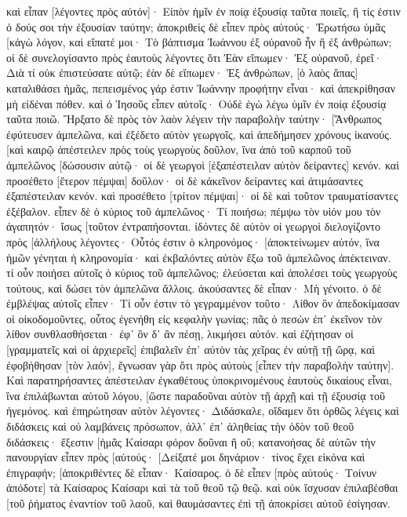 καὶ εἶπαν [λέγοντες πρὸς αὐτόν]· Εἰπὸν ἡμῖν ἐν ποίᾳ ἐξουσίᾳ ταῦτα ποιεῖς, ἢ τίς ἐστιν ὁ δούς σοι τὴν ἐξουσίαν ταύτην; 
ἀποκριθεὶς δὲ εἶπεν πρὸς αὐτούς· Ἐρωτήσω ὑμᾶς [κἀγὼ λόγον, καὶ εἴπατέ μοι· 
Τὸ βάπτισμα Ἰωάννου ἐξ οὐρανοῦ ἦν ἢ ἐξ ἀνθρώπων; 
οἱ δὲ συνελογίσαντο πρὸς ἑαυτοὺς λέγοντες ὅτι Ἐὰν εἴπωμεν· Ἐξ οὐρανοῦ, ἐρεῖ· Διὰ τί οὐκ ἐπιστεύσατε αὐτῷ; 
ἐὰν δὲ εἴπωμεν· Ἐξ ἀνθρώπων, [ὁ λαὸς ἅπας] καταλιθάσει ἡμᾶς, πεπεισμένος γάρ ἐστιν Ἰωάννην προφήτην εἶναι· 
καὶ ἀπεκρίθησαν μὴ εἰδέναι πόθεν. 
καὶ ὁ Ἰησοῦς εἶπεν αὐτοῖς· Οὐδὲ ἐγὼ λέγω ὑμῖν ἐν ποίᾳ ἐξουσίᾳ ταῦτα ποιῶ. 
Ἤρξατο δὲ πρὸς τὸν λαὸν λέγειν τὴν παραβολὴν ταύτην· [Ἄνθρωπος ἐφύτευσεν ἀμπελῶνα, καὶ ἐξέδετο αὐτὸν γεωργοῖς, καὶ ἀπεδήμησεν χρόνους ἱκανούς. 
[καὶ καιρῷ ἀπέστειλεν πρὸς τοὺς γεωργοὺς δοῦλον, ἵνα ἀπὸ τοῦ καρποῦ τοῦ ἀμπελῶνος [δώσουσιν αὐτῷ· οἱ δὲ γεωργοὶ [ἐξαπέστειλαν αὐτὸν δείραντες] κενόν. 
καὶ προσέθετο [ἕτερον πέμψαι] δοῦλον· οἱ δὲ κἀκεῖνον δείραντες καὶ ἀτιμάσαντες ἐξαπέστειλαν κενόν. 
καὶ προσέθετο [τρίτον πέμψαι]· οἱ δὲ καὶ τοῦτον τραυματίσαντες ἐξέβαλον. 
εἶπεν δὲ ὁ κύριος τοῦ ἀμπελῶνος· Τί ποιήσω; πέμψω τὸν υἱόν μου τὸν ἀγαπητόν· ἴσως [τοῦτον ἐντραπήσονται. 
ἰδόντες δὲ αὐτὸν οἱ γεωργοὶ διελογίζοντο πρὸς [ἀλλήλους λέγοντες· Οὗτός ἐστιν ὁ κληρονόμος· [ἀποκτείνωμεν αὐτόν, ἵνα ἡμῶν γένηται ἡ κληρονομία· 
καὶ ἐκβαλόντες αὐτὸν ἔξω τοῦ ἀμπελῶνος ἀπέκτειναν. τί οὖν ποιήσει αὐτοῖς ὁ κύριος τοῦ ἀμπελῶνος; 
ἐλεύσεται καὶ ἀπολέσει τοὺς γεωργοὺς τούτους, καὶ δώσει τὸν ἀμπελῶνα ἄλλοις. ἀκούσαντες δὲ εἶπαν· Μὴ γένοιτο. 
ὁ δὲ ἐμβλέψας αὐτοῖς εἶπεν· Τί οὖν ἐστιν τὸ γεγραμμένον τοῦτο· Λίθον ὃν ἀπεδοκίμασαν οἱ οἰκοδομοῦντες, οὗτος ἐγενήθη εἰς κεφαλὴν γωνίας; 
πᾶς ὁ πεσὼν ἐπ᾽ ἐκεῖνον τὸν λίθον συνθλασθήσεται· ἐφ᾽ ὃν δ᾽ ἂν πέσῃ, λικμήσει αὐτόν. 
καὶ ἐζήτησαν οἱ [γραμματεῖς καὶ οἱ ἀρχιερεῖς] ἐπιβαλεῖν ἐπ᾽ αὐτὸν τὰς χεῖρας ἐν αὐτῇ τῇ ὥρᾳ, καὶ ἐφοβήθησαν [τὸν λαόν], ἔγνωσαν γὰρ ὅτι πρὸς αὐτοὺς [εἶπεν τὴν παραβολὴν ταύτην]. 
Καὶ παρατηρήσαντες ἀπέστειλαν ἐγκαθέτους ὑποκρινομένους ἑαυτοὺς δικαίους εἶναι, ἵνα ἐπιλάβωνται αὐτοῦ λόγου, [ὥστε παραδοῦναι αὐτὸν τῇ ἀρχῇ καὶ τῇ ἐξουσίᾳ τοῦ ἡγεμόνος. 
καὶ ἐπηρώτησαν αὐτὸν λέγοντες· Διδάσκαλε, οἴδαμεν ὅτι ὀρθῶς λέγεις καὶ διδάσκεις καὶ οὐ λαμβάνεις πρόσωπον, ἀλλ᾽ ἐπ᾽ ἀληθείας τὴν ὁδὸν τοῦ θεοῦ διδάσκεις· 
ἔξεστιν [ἡμᾶς Καίσαρι φόρον δοῦναι ἢ οὔ; 
κατανοήσας δὲ αὐτῶν τὴν πανουργίαν εἶπεν πρὸς [αὐτούς· 
[Δείξατέ μοι δηνάριον· τίνος ἔχει εἰκόνα καὶ ἐπιγραφήν; [ἀποκριθέντες δὲ εἶπαν· Καίσαρος. 
ὁ δὲ εἶπεν [πρὸς αὐτούς· Τοίνυν ἀπόδοτε] τὰ Καίσαρος Καίσαρι καὶ τὰ τοῦ θεοῦ τῷ θεῷ. 
καὶ οὐκ ἴσχυσαν ἐπιλαβέσθαι [τοῦ ῥήματος ἐναντίον τοῦ λαοῦ, καὶ θαυμάσαντες ἐπὶ τῇ ἀποκρίσει αὐτοῦ ἐσίγησαν. 
